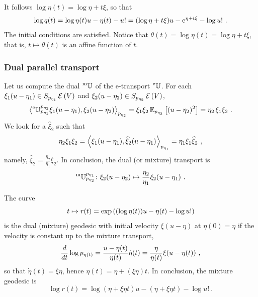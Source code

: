 \documentclass[12pt,a4paper]{amsart}
\begin{document}
It follows $\log \eta(t) = \log \eta + t \xi$, so that
\begin{equation}
  \label{eq:17}
  \log q(t) = \log \eta(t)u - \eta(t) - u! = (\log \eta + t \xi) u - \euler^{\eta + t \xi} - \log u! \ . 
\end{equation}
The initial conditions are satisfied. Notice that $\theta(t) = \log \eta(t) = \log \eta + t \xi$, that is, $t \mapsto \theta(t)$ is an affine function of $t$.

\subsubsection{Dual parallel transport}
Let us compute the dual $\prescript{\text{m}}{} {\mathbb U} _ {} ^ {}$ of the e-transport $\prescript{\text{e}}{} {\mathbb U} _ {} ^ {}$. For each $\xi_1(u - \eta_1) \in S_{p_{\eta_1}}\operatorname{\mathcal E}\left(V\right)$ and $\xi_2(u - \eta_2) \in S_{p_{\eta_2}}\operatorname{\mathcal E}\left(V\right)$,
\begin{equation}
  \label{eq:4}
  \scalarat {p_{\eta_2}} {\etransport {p_{\eta_1}}{p_{\eta_2}} \xi_1(u - \eta_1)} {\xi_2(u - \eta_2)} = \xi_1 \xi_2 \expectat {p_{\eta_2}} {(u - \eta_2)^2} =  \eta_2\,\xi_1 \xi_2 \ .
\end{equation}
We look for a $\widehat{\xi}_2$ such that
\begin{equation}
  \label{eq:7}
   \eta_2 \xi_1\xi_2 = \scalarat {p_{\eta_1}} {\xi_1(u - \eta_1)}{\widehat{\xi}_2(u - \eta_1)} = \eta_1 \xi_1 \widehat{\xi}_2 \ ,
\end{equation}
namely, $\widehat{\xi}_2 = \frac {\eta_2}{\eta_1} \xi_2$. In conclusion, the dual (or mixture) transport is
\begin{equation}
  \label{eq:18}
  \mtransport {p_{\eta_2}}{p_{\eta_1}} \colon \xi_2(u - \eta_2) \mapsto \frac {\eta_2}{\eta_1} \xi_2 (u - \eta_1) \ .
\end{equation}

The curve
\begin{equation}
    t \mapsto r(t) = \exp\left((\log \eta(t))u - \eta(t) - \log u!\right)
\end{equation}
is the dual (mixture) geodesic with initial velocity $\xi (u - \eta)$ at $\eta(0) = \eta$ if the velocity is constant up to the mixture transport,
\begin{equation}
  \label{eq:19}
  \derivby t \log p_{\eta(t)} = \frac {u - \eta(t)} {\eta(t)} \dot \eta(t)=  \frac \eta {\eta(t)}\xi (u - \eta(t)) \ ,  
\end{equation}
so that $\dot \eta(t) = \xi \eta$, hence $\eta(t) = \eta + (\xi \eta) t$. In conclusion, the mixture geodesic is
\begin{equation}
  \label{eq:23}
  \log r(t) = \log (\eta + \xi \eta t)u - (\eta + \xi \eta t) - \log u! \ .
\end{equation}
\end{document}
